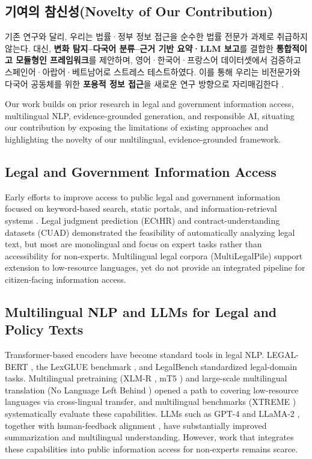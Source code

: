{\subsection{기여의 참신성(Novelty of Our Contribution)}
기존 연구와 달리, 우리는 법률·정부 정보 접근을 순수한 법률 전문가 과제로 취급하지 않는다.
대신, \textbf{변화 탐지–다국어 분류–근거 기반 요약·LLM 보고}를 결합한 \textbf{통합적이고 모듈형인 프레임워크}를 제안하며,
영어·한국어·프랑스어 데이터셋에서 검증하고 스페인어·아랍어·베트남어로 스트레스 테스트하였다.
이를 통해 우리는 비전문가와 다국어 공동체를 위한 \textbf{포용적 정보 접근}을 새로운 연구 방향으로 자리매김한다 \cite{devlin2019bert, bommasani2021foundation}.


}{%

Our work builds on prior research in legal and government information access, multilingual NLP, evidence-grounded generation, and responsible AI, situating our contribution by exposing the limitations of existing approaches and highlighting the novelty of our multilingual, evidence-grounded framework.


\subsection{Legal and Government Information Access}
Early efforts to improve access to public legal and government information focused on keyword-based search, static portals, and information-retrieval systems \cite{zhong2020legalai}.
Legal judgment prediction (ECtHR) \cite{aletras2016echr} and contract-understanding datasets (CUAD) \cite{hendrycks2021cuad} demonstrated the feasibility of automatically analyzing legal text, but most are monolingual and focus on expert tasks rather than accessibility for non-experts.
Multilingual legal corpora (MultiLegalPile) \cite{niklaus2023multilegal} support extension to low-resource languages, yet do not provide an integrated pipeline for citizen-facing information access.

\subsection{Multilingual NLP and LLMs for Legal and Policy Texts}
Transformer-based encoders have become standard tools in legal NLP. LEGAL-BERT \cite{chalkidis2020legalbert}, the LexGLUE benchmark \cite{chalkidis2022lexglue}, and LegalBench \cite{guha2023legalbench} standardized legal-domain tasks.
Multilingual pretraining (XLM-R \cite{conneau2020xlmr}, mT5 \cite{xue2021mt5}) and large-scale multilingual translation (No Language Left Behind \cite{nllb2022}) opened a path to covering low-resource languages via cross-lingual transfer, and multilingual benchmarks (XTREME \cite{hu2020xtreme}) systematically evaluate these capabilities.
LLMs such as GPT-4 \cite{openai2023gpt4} and LLaMA-2 \cite{touvron2023llama2}, together with human-feedback alignment \cite{ouyang2022instructgpt}, have substantially improved summarization and multilingual understanding.
However, work that integrates these capabilities into public information access for non-experts remains scarce.

}
